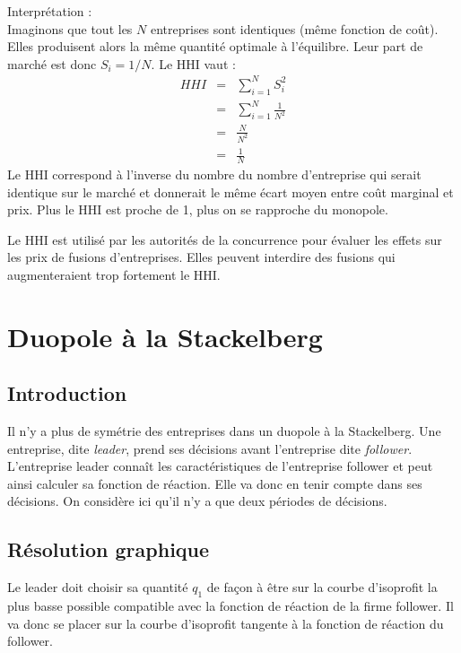 \documentclass[
]{book}
\theoremstyle{definition}
\theoremstyle{definition}
\theoremstyle{definition}
\theoremstyle{definition}
\theoremstyle{remark}
\begin{document}
Interprétation :\\
Imaginons que tout les \(N\) entreprises sont identiques (même fonction de coût).
Elles produisent alors la même quantité optimale à l'équilibre.
Leur part de marché est donc \(S_i=1/N\).
Le HHI vaut :
\[
\begin{array}{rcl}
HHI&=&\sum_{i=1}^NS_i^2\\
&=&\sum_{i=1}^N\frac{1}{N^2}\\
&=&\frac{N}{N^2} \\
&=&\frac{1}{N}
\end{array}
\]
Le HHI correspond à l'inverse du nombre du nombre d'entreprise qui serait identique sur le marché et donnerait le même écart moyen entre coût marginal et prix.
Plus le HHI est proche de 1, plus on se rapproche du monopole.

Le HHI est utilisé par les autorités de la concurrence pour évaluer les effets sur les prix de fusions d'entreprises.
Elles peuvent interdire des fusions qui augmenteraient trop fortement le HHI.

\hypertarget{duopole-uxe0-la-stackelberg}{%
\section{Duopole à la Stackelberg}\label{duopole-uxe0-la-stackelberg}}

\hypertarget{introduction-2}{%
\subsection{Introduction}\label{introduction-2}}

Il n'y a plus de symétrie des entreprises dans un duopole à la Stackelberg.
Une entreprise, dite \emph{leader}, prend ses décisions avant l'entreprise dite \emph{follower}.
L'entreprise leader connaît les caractéristiques de l'entreprise follower et peut ainsi calculer sa fonction de réaction.
Elle va donc en tenir compte dans ses décisions.
On considère ici qu'il n'y a que deux périodes de décisions.

\hypertarget{ruxe9solution-graphique}{%
\subsection{Résolution graphique}\label{ruxe9solution-graphique}}

Le leader doit choisir sa quantité \(q_1\) de façon à être sur la courbe d'isoprofit la plus basse possible compatible avec la fonction de réaction de la firme follower.
Il va donc se placer sur la courbe d'isoprofit tangente à la fonction de réaction du follower.
\end{document}
